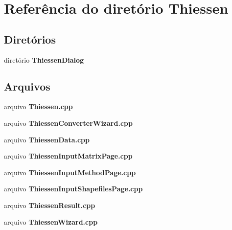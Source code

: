 \section{Referência do diretório Thiessen}
\label{dir_6d1d65b0c40af0b9bad7653238a6f275}
\subsection*{Diretórios}
\begin{DoxyCompactItemize}
\item 
diretório {\bf Thiessen\+Dialog}
\end{DoxyCompactItemize}
\subsection*{Arquivos}
\begin{DoxyCompactItemize}
\item 
arquivo {\bf Thiessen.\+cpp}
\item 
arquivo {\bf Thiessen\+Converter\+Wizard.\+cpp}
\item 
arquivo {\bf Thiessen\+Data.\+cpp}
\item 
arquivo {\bf Thiessen\+Input\+Matrix\+Page.\+cpp}
\item 
arquivo {\bf Thiessen\+Input\+Method\+Page.\+cpp}
\item 
arquivo {\bf Thiessen\+Input\+Shapefiles\+Page.\+cpp}
\item 
arquivo {\bf Thiessen\+Result.\+cpp}
\item 
arquivo {\bf Thiessen\+Wizard.\+cpp}
\end{DoxyCompactItemize}
